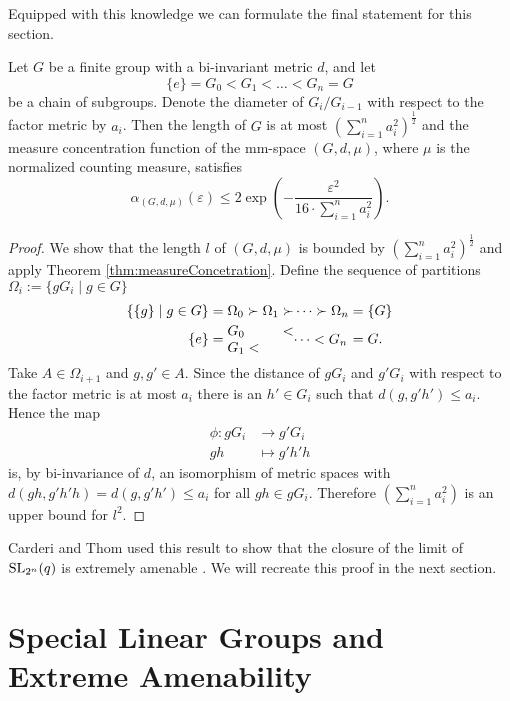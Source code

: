 Equipped with this knowledge we can formulate the final statement for this section. 
\begin{corollary}\label{cor:meaContractionGroups}
	Let $G$ be a finite group with a bi-invariant metric $d$, and let
	\[\{e\}=G_0<G_1<\dots <G_n=G\]
	be a chain of subgroups. Denote the diameter of $G_i/G_{i-1}$ with respect to the factor metric by $a_i$. Then the length of $G$ is at most $\left(\sum_{i=1}^{n}a_i^2\right)^{\frac{1}{2}}$ and the measure concentration function of the mm-space $(G,d,\mu)$, where $\mu$ is the normalized counting measure, satisfies
	\[\alpha_{(G,d,\mu)}(\varepsilon)\leq 2\exp\left(-\frac{\varepsilon^2}{16\cdot\sum_{i=1}^{n}a_i^2}\right).\]
\end{corollary}
\begin{proof}
	We show that the length $l$ of $(G,d,\mu)$ is bounded by $\left(\sum_{i=1}^{n}a_i^2\right)^{\frac{1}{2}}$ and apply Theorem \ref{thm:measureConcetration}. Define the sequence of partitions $\Omega_i:=\{g G_i\mid g\in G\}$
	\begin{align*}
		\{\{g\}\mid g\in G\}=\Omega_0\succ\Omega_1\succ                   & \dots\succ\Omega_n=\{G\}                                   \\
		\{e\}=\parbox{\widthof{$\Omega_0\succ\Omega_1\succ$}}{$G_0<G_1<$} & \parbox{\widthof{${}\dots\succ\Omega_n$}}{$\dots <G_n$}=G. 
	\end{align*}
	Take $A\in \Omega_{i+1}$ and $g,g'\in A$. Since the distance of $gG_i$ and $g'G_i$ with respect to the factor metric is at most $a_i$ there is an $h'\in G_i$ such that $d(g,g'h')\leq a_i$. Hence the map 
	\begin{align*}
		\phi\colon g G_i & {}\to g'G_i     \\
		gh               & {}\mapsto g'h'h 
	\end{align*}
	is, by bi-invariance of $d$, an isomorphism of metric spaces with $d(gh,g'h'h)=d(g,g'h')\leq a_i$ for all $gh\in gG_i$.
	Therefore $\left(\sum_{i=1}^{n}a_i^2\right)$ is an upper bound for $l^2$. 
\end{proof}
Carderi and Thom used this result to show that the closure of the limit of $\operatorname{SL}_{2^n}(q)$ is extremely amenable \cite{thom}. We will recreate this proof in the next section. 
		
		
\section{Special Linear Groups and Extreme Amenability}\label{sec:thom}
		
